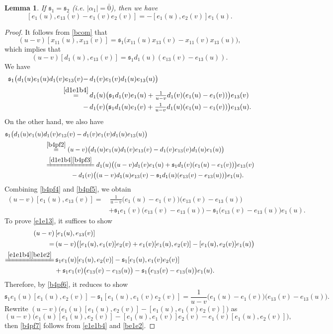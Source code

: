 \documentclass[11pt,reqno]{amsart}
\numberwithin{equation}{section}
\newtheorem{lem}[thm]{Lemma}
\theoremstyle{definition}
\theoremstyle{remark}
\newcommand{\beq}{\begin{equation}}
\newcommand{\eeq}{\end{equation}}
\newcommand{\ka}{{\mathfrak s}}
\begin{document}
\begin{lem}\label{lemhelp1}
If $\ka_1=\ka_2$ \emph{(}i.e. $|\alpha_1|=\bar 0$\emph{)}, then we have
\beq\label{e1e13}
[e_1(u),e_{13}(v)-e_1(v)e_2(v)]=-[e_1(u),e_2(v)]e_1(u).
\eeq
\end{lem}
\begin{proof}
It follows from \eqref{bcom} that
\[
(u-v)[x_{11}(u),x_{13}(v)]=\ka_1\big(x_{11}(u)x_{13}(v)-x_{11}(v)x_{13}(u)\big),
\]
which implies that
\beq\label{b4pf3}
(u-v)[d_1(u),e_{13}(v)]=\ka_1d_1(u)(e_{13}(v)-e_{13}(u)).
\eeq
We have
\beq\label{b4pf4}
\begin{split}
\ka_1\big(d_1(u)e_1(u)d_1(v)e_{13}(v)-&\, d_1(v)e_1(v)d_1(u)e_{13}(u)\big)\\
\stackrel{\eqref{d1e1b4}}{=}&\, d_1(u)\big(\ka_1d_1(v)e_1(u)+\tfrac{1}{u-v}d_1(v)(e_1(u)-e_1(v))\big)e_{13}(v)\\
-&\,d_1(v)\big(\ka_1d_1(u)e_1(v)+\tfrac{1}{u-v}d_1(u)(e_1(u)-e_1(v))\big)e_{13}(u).
\end{split}
\eeq
On the other hand, we also have
\beq\label{b4pf5}
\begin{split}
\ka_1\big(d_1(u)e_1(u)& d_1(v)e_{13}(v)- d_1(v)e_1(v)d_1(u)e_{13}(u)\big)\\
&\, \stackrel{\eqref{b4pf2}}{=}(u-v)\big(d_1(u)e_1(u)d_1(v)e_{13}(v)-d_1(v)e_{13}(v)d_1(u)e_{1}(u)\big)\\
&\, \xlongequal{\eqref{d1e1b4}\eqref{b4pf3}}d_1(u)\big((u-v)d_1(v)e_1(u)+\ka_1d_1(v)(e_1(u)-e_1(v))\big)e_{13}(v)\\
& \qquad\qquad \, -d_1(v)\big((u-v)d_1(u)e_{13}(v)-\ka_1d_1(u)(e_{13}(v)-e_{13}(u))\big)e_1(u).
\end{split}
\eeq
Combining \eqref{b4pf4} and \eqref{b4pf5}, we obtain
\beq\label{b4pf6}
\begin{split}
(u-v)[e_1(u),e_{13}(v)]=&\,\frac{1}{u-v}\big(e_1(u)-e_1(v)\big)\big(e_{13}(v)-e_{13}(u)\big)\\&+\ka_1e_1(v)\big(e_{13}(v)-e_{13}(u)\big)-\ka_1\big(e_{13}(v)-e_{13}(u)\big)e_1(u).
\end{split}
\eeq
To prove \eqref{e1e13}, it suffices to show
\begin{align*}
(u-v)&\,[e_1(u),e_{13}(v)]\\
=&\,(u-v)\big([e_1(u),e_1(v)]e_2(v)+e_1(v)[e_1(u),e_2(v)]-[e_1(u),e_2(v)]e_1(u)\big)\\
\xlongequal{\eqref{e1e1b4}\eqref{be1e2}}&\, \ka_1e_1(u)[e_1(u),e_2(v)]-\ka_1[e_1(u),e_1(v)e_2(v)]\\
&+\ka_1e_1(v)\big(e_{13}(v)-e_{13}(u)\big)-\ka_1\big(e_{13}(v)-e_{13}(u)\big)e_1(u).
\end{align*}
Therefore, by \eqref{b4pf6}, it reduces to show
\beq\label{b4pf7}
\ka_1e_1(u)[e_1(u),e_2(v)]-\ka_1[e_1(u),e_1(v)e_2(v)]=\frac{1}{u-v}\big(e_1(u)-e_1(v)\big)\big(e_{13}(v)-e_{13}(u)\big).
\eeq
Rewrite $(u-v)\big(e_1(u)[e_1(u),e_2(v)]-[e_1(u),e_1(v)e_2(v)]\big)$ as
\[
(u-v)\big(e_1(u)[e_1(u),e_2(v)]-[e_1(u),e_1(v)]e_2(v)-e_1(v)[e_1(u),e_2(v)]\big),
\]
then \eqref{b4pf7} follows from \eqref{e1e1b4} and \eqref{be1e2}.
\end{proof}
\end{document}
